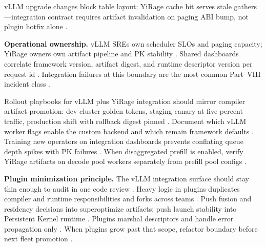 \begin{example}
vLLM upgrade changes block table layout: YiRage cache hit serves stale gathers---integration contract requires artifact invalidation on paging ABI bump, not plugin hotfix alone \citep{kwon2023vllm,yirage2026,chen2020compilerbasedhardw,patel2025llminference,memoryfloor2026,taxbreak2026,dlbook}.
\end{example}

\textbf{Operational ownership.} vLLM SREs own scheduler SLOs and paging capacity; YiRage owners own artifact pipeline and PK stability \citep{kwon2023vllm,yirage2026,chen2020compilerbasedhardw,patel2025llminference,dlbook}. Shared dashboards correlate framework version, artifact digest, and runtime descriptor version per request id \citep{patel2025llminference,yirage2026,chen2020compilerbasedhardw,kwon2023vllm,dlbook}. Integration failures at this boundary are the most common Part~VIII incident class \citep{kwon2023vllm,yirage2026,chen2020compilerbasedhardw,patel2025llminference,taxbreak2026,memoryfloor2026,dlbook}.

Rollout playbooks for vLLM plus YiRage integration should mirror compiler artifact promotion: dev cluster golden tokens, staging canary at five percent traffic, production shift with rollback digest pinned \citep{kwon2023vllm,yirage2026,chen2020compilerbasedhardw,patel2025llminference,taxbreak2026,memoryfloor2026,dlbook}. Document which vLLM worker flags enable the custom backend and which remain framework defaults \citep{kwon2023vllm,patel2025llminference,yirage2026,chen2020compilerbasedhardw,dlbook}. Training new operators on integration dashboards prevents conflating queue depth spikes with PK failures \citep{patel2025llminference,kwon2023vllm,yirage2026,chen2020compilerbasedhardw,dlbook}. When disaggregated prefill is enabled, verify YiRage artifacts on decode pool workers separately from prefill pool configs \citep{liu2024deepseekv3,kwon2023vllm,patel2025llminference,yirage2026,chen2020compilerbasedhardw,dlbook}.

\textbf{Plugin minimization principle.} The vLLM integration surface should stay thin enough to audit in one code review \citep{kwon2023vllm,yirage2026,chen2020compilerbasedhardw,patel2025llminference,dlbook}. Heavy logic in plugins duplicates compiler and runtime responsibilities and forks across teams \citep{yirage2026,chen2020compilerbasedhardw,patel2025llminference,kwon2023vllm,dlbook}. Push fusion and residency decisions into superoptimize artifacts; push launch stability into Persistent Kernel runtime \citep{yirage2026,chen2020compilerbasedhardw,patel2025llminference,taxbreak2026,memoryfloor2026,dlbook}. Plugins marshal descriptors and handle error propagation only \citep{kwon2023vllm,yirage2026,chen2020compilerbasedhardw,patel2025llminference,dlbook}. When plugins grow past that scope, refactor boundary before next fleet promotion \citep{patel2025llminference,yirage2026,chen2020compilerbasedhardw,kwon2023vllm,dlbook}.

